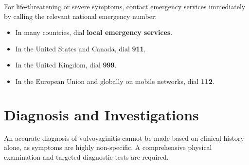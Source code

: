For life-threatening or severe symptoms, contact emergency services immediately by calling the relevant national emergency number:
\begin{itemize}
    \item In many countries, dial \textbf{local emergency services}.
    \item In the United States and Canada, dial \textbf{911}.
    \item In the United Kingdom, dial \textbf{999}.
    \item In the European Union and globally on mobile networks, dial \textbf{112}.
\end{itemize}

\section*{Diagnosis and Investigations}
An accurate diagnosis of vulvovaginitis cannot be made based on clinical history alone, as symptoms are highly non-specific. A comprehensive physical examination and targeted diagnostic tests are required.
